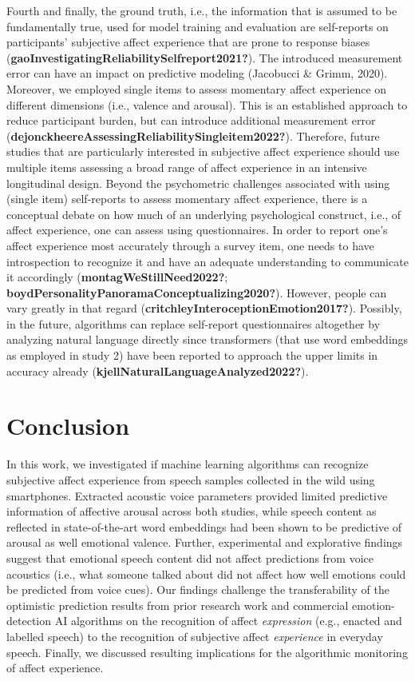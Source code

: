 \documentclass[
  english,
  man,floatsintext]{apa6}
\begin{document}
Fourth and finally, the ground truth, i.e., the information that is assumed to be fundamentally true, used for model training and evaluation are self-reports on participants' subjective affect experience that are prone to response biases (\textbf{gaoInvestigatingReliabilitySelfreport2021?}). The introduced measurement error can have an impact on predictive modeling (Jacobucci \& Grimm, 2020). Moreover, we employed single items to assess momentary affect experience on different dimensions (i.e., valence and arousal). This is an established approach to reduce participant burden, but can introduce additional measurement error (\textbf{dejonckheereAssessingReliabilitySingleitem2022?}). Therefore, future studies that are particularly interested in subjective affect experience should use multiple items assessing a broad range of affect experience in an intensive longitudinal design. Beyond the psychometric challenges associated with using (single item) self-reports to assess momentary affect experience, there is a conceptual debate on how much of an underlying psychological construct, i.e., of affect experience, one can assess using questionnaires. In order to report one's affect experience most accurately through a survey item, one needs to have introspection to recognize it and have an adequate understanding to communicate it accordingly (\textbf{montagWeStillNeed2022?}; \textbf{boydPersonalityPanoramaConceptualizing2020?}). However, people can vary greatly in that regard (\textbf{critchleyInteroceptionEmotion2017?}). Possibly, in the future, algorithms can replace self-report questionnaires altogether by analyzing natural language directly since transformers (that use word embeddings as employed in study 2) have been reported to approach the upper limits in accuracy already (\textbf{kjellNaturalLanguageAnalyzed2022?}).

\hypertarget{conclusion}{%
\section{Conclusion}\label{conclusion}}

In this work, we investigated if machine learning algorithms can recognize subjective affect experience from speech samples collected in the wild using smartphones. Extracted acoustic voice parameters provided limited predictive information of affective arousal across both studies, while speech content as reflected in state-of-the-art word embeddings had been shown to be predictive of arousal as well emotional valence. Further, experimental and explorative findings suggest that emotional speech content did not affect predictions from voice acoustics (i.e., what someone talked about did not affect how well emotions could be predicted from voice cues). Our findings challenge the transferability of the optimistic prediction results from prior research work and commercial emotion-detection AI algorithms on the recognition of affect \emph{expression} (e.g., enacted and labelled speech) to the recognition of subjective affect \emph{experience} in everyday speech. Finally, we discussed resulting implications for the algorithmic monitoring of affect experience.
\end{document}
